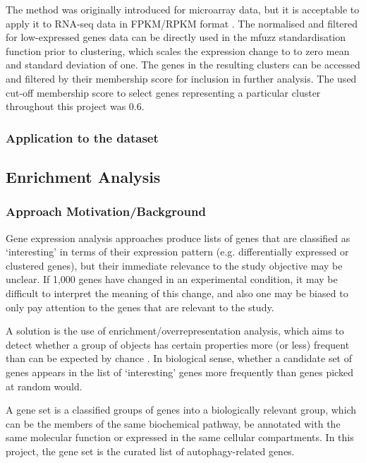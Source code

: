   
 
The method was originally introduced for microarray data, but it is acceptable to apply it to RNA-seq data in FPKM/RPKM format \cite{Futschik2007MfuzzHomepage}.  The normalised and filtered for low-expressed genes data can be directly used in the mfuzz standardisation function prior to clustering, which scales the expression change to to zero mean and standard deviation of one.
The genes in the resulting clusters can be accessed and filtered by their membership score for inclusion in further analysis. The used cut-off membership score to select genes representing a particular cluster throughout this project was 0.6. 
\subsubsection{Application to the dataset}




    \newpage
    \subsection{Enrichment Analysis}
    
    
      \subsubsection{Approach Motivation/Background}
        Gene expression analysis approaches produce lists of genes that are classified as ‘interesting’ in terms of their expression pattern (e.g. differentially expressed or clustered genes), but their immediate relevance to the study objective may be unclear. If 1,000 genes have changed in an experimental condition, it may be difficult to interpret the meaning of this change, and also one may be biased to only pay attention to the genes that are relevant to the study. 

        A solution is the use of enrichment/overrepresentation analysis, which aims to detect whether a group of objects has certain properties more (or less) frequent than can be expected by chance \cite{Goeman2007AnalyzingIssues}. In biological sense, whether a candidate set of genes appears in the list of ‘interesting’ genes more frequently than genes picked at random would. 

        A gene set is a classified groups of genes into a biologically relevant group, which can be the members of the same biochemical pathway, be annotated with the same molecular function or expressed in the same cellular compartments. In this project, the gene set is the curated list of autophagy-related genes. 
        
